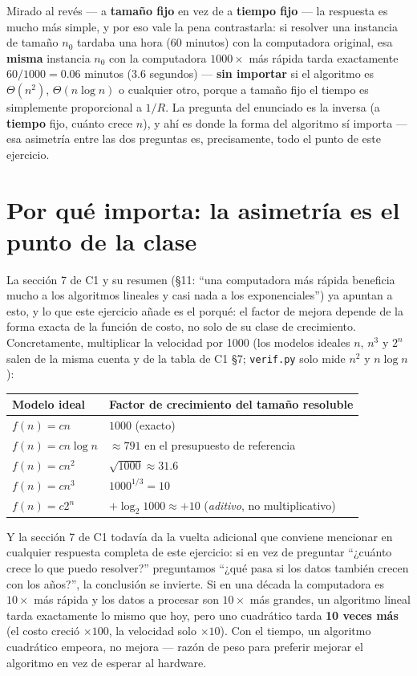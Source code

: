 \documentclass[11pt]{article}
\begin{document}
Mirado al revés --- a \textbf{tamaño fijo} en vez de a \textbf{tiempo fijo} --- la respuesta es mucho más
simple, y por eso vale la pena contrastarla: si resolver una instancia de tamaño $n_0$ tardaba una hora
(60 minutos) con la computadora original, esa \textbf{misma} instancia $n_0$ con la computadora
$1000\times$ más rápida tarda exactamente $60/1000=0.06$ minutos ($3.6$ segundos) --- \textbf{sin importar}
si el algoritmo es $\Theta(n^2)$, $\Theta(n\log n)$ o cualquier otro, porque a tamaño fijo el tiempo es
simplemente proporcional a $1/R$. La pregunta del enunciado es la inversa (a \textbf{tiempo} fijo, cuánto
crece $n$), y ahí es donde la forma del algoritmo sí importa --- esa asimetría entre las dos preguntas es,
precisamente, todo el punto de este ejercicio.

\section{Por qué importa: la asimetría es el punto de la clase}

La sección 7 de C1 y su resumen (§11: ``una computadora más rápida beneficia mucho a los algoritmos
lineales y casi nada a los exponenciales'') ya apuntan a esto, y lo que este ejercicio añade es el porqué: el
factor de mejora depende de la forma exacta de la función de costo, no solo de su clase de crecimiento.
Concretamente, multiplicar la velocidad por 1000 (los modelos ideales $n$, $n^3$ y $2^n$ salen de la misma cuenta
y de la tabla de C1 §7; \texttt{verif.py} solo mide $n^2$ y $n\log n$):

\begin{center}
\begin{tabular}{@{}ll@{}}
\toprule
\textbf{Modelo ideal} & \textbf{Factor de crecimiento del tamaño resoluble} \\
\midrule
$f(n)=c n$ & $1000$ (exacto) \\
$f(n)=c n\log n$ & $\approx 791$ en el presupuesto de referencia \\
$f(n)=c n^2$ & $\sqrt{1000}\approx 31.6$ \\
$f(n)=c n^3$ & $1000^{1/3}=10$ \\
$f(n)=c 2^n$ & $+\log_2 1000\approx +10$ \quad (\emph{aditivo}, no multiplicativo) \\
\bottomrule
\end{tabular}
\end{center}

Y la sección 7 de C1 todavía da la vuelta adicional que conviene mencionar en cualquier respuesta
completa de este ejercicio: si en vez de preguntar ``¿cuánto crece lo que puedo resolver?'' preguntamos
``¿qué pasa si los datos también crecen con los años?'', la conclusión se invierte. Si en una década la
computadora es $10\times$ más rápida y los datos a procesar son $10\times$ más grandes, un algoritmo
lineal tarda exactamente lo mismo que hoy, pero uno cuadrático tarda \textbf{10 veces más} (el costo
creció $\times 100$, la velocidad solo $\times 10$). Con el tiempo, un algoritmo cuadrático empeora, no
mejora --- razón de peso para preferir mejorar el algoritmo en vez de esperar al hardware.
\end{document}

